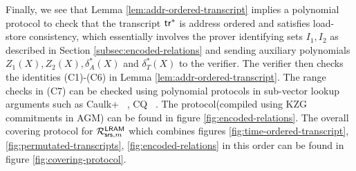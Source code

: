 Finally, we see that Lemma \ref{lem:addr-ordered-transcript} implies a polynomial protocol to check that the transcript
$\mathsf{tr}^\ast$ is address ordered and satisfies load-store consistency, which
essentially involves the prover identifying sets
$I_1, I_2$ as described in Section \ref{subsec:encoded-relations} and sending auxiliary polynomials $Z_1(X),Z_2(X),\delta^\ast_A(X)$ and $\delta^\ast_T(X)$ to the verifier.
The verifier then checks the identities (C1)-(C6) in Lemma \ref{lem:addr-ordered-transcript}.
The range checks in (C7) can be checked using polynomial protocols in sub-vector lookup arguments such as Caulk+ ~\cite{EPRINT:PosKat22}, CQ
~\cite{EPRINT:EagFioGab22}. The protocol(compiled using KZG commitments in AGM) can be found in figure \ref{fig:encoded-relations}. The overall covering protocol for $\mathcal{R}^{\mathsf{LRAM}}_{\mathsf{srs},m}$ which combines figures \ref{fig:time-ordered-transcript}, \ref{fig:permutated-transcripts}, \ref{fig:encoded-relations} in this order can be found in figure \ref{fig:covering-protocol}.
